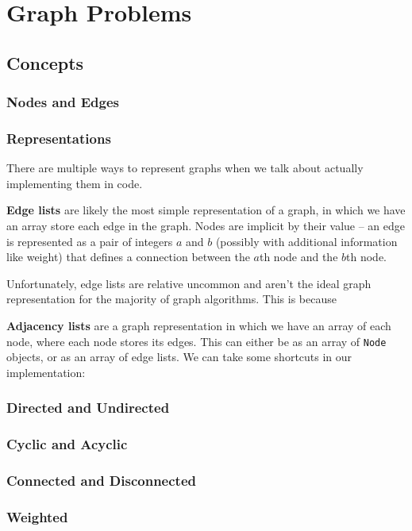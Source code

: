 \section{Graph Problems}
\subsection{Concepts}
\subsubsection{Nodes and Edges}
\subsubsection{Representations}

There are multiple ways to represent graphs when we talk about actually implementing them in code.

\textbf{Edge lists} are likely the most simple representation of a graph, in which we have an array store each edge in the graph. Nodes are implicit by their value -- an edge is represented as a pair of integers $a$ and $b$ (possibly with additional information like weight) that defines a connection between the $a$th node and the $b$th node.


Unfortunately, edge lists are relative uncommon and aren't the ideal graph representation for the majority of graph algorithms. This is because 

\textbf{Adjacency lists} are a graph representation in which we have an array of each node, where each node stores its edges. This can either be as an array of \texttt{Node} objects, or as an array of edge lists. We can take some shortcuts in our implementation:


\subsubsection{Directed and Undirected}
\subsubsection{Cyclic and Acyclic}
\subsubsection{Connected and Disconnected}
\subsubsection{Weighted}
